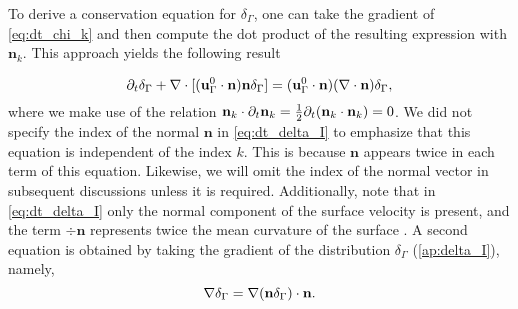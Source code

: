 To derive a conservation equation for $\delta_\Gamma$, one can take the gradient of \ref{eq:dt_chi_k} and then compute the dot product of the resulting expression with $\textbf{n}_k$. This approach yields the following result \citep{marle1982macroscopic,drew1990,lhuillier2000bilan,junqua2003}

\begin{equation}
    \pddt \delta_\Gamma
    + \div [(\textbf{u}_\Gamma^0\cdot \textbf{n}) \textbf{n}\delta_\Gamma ]
    = (\textbf{u}_\Gamma^0 \cdot \textbf{n})(\div\textbf{n}) \delta_\Gamma ,
    \label{eq:dt_delta_I}
\end{equation} 
where we make use of the relation $\textbf{n}_k\cdot \partial_t\textbf{n}_k= \frac{1}{2}\partial_t(\textbf{n}_k\cdot \textbf{n}_k) = 0$. 
We did not specify the index of the normal $\textbf{n}$ in \ref{eq:dt_delta_I} to emphasize that this equation is independent of the index $k$. This is because $\textbf{n}$ appears twice in each term of this equation. 
Likewise, we will omit the index of the normal vector in subsequent discussions unless it is required.
Additionally, note that in \ref{eq:dt_delta_I} only the normal component of the surface velocity is present, and the term $\div \textbf{n}$ represents twice the mean curvature of the surface \citep{aris2012vectors}.  %
A second equation is obtained by taking the gradient of the distribution $\delta_\Gamma $ (\ref{ap:delta_I}), namely, 
\begin{equation}
    \grad\delta_\Gamma  
    =   \grad (\textbf{n} \delta_\Gamma) \cdot \textbf{n}.
    \label{eq:grad_delta_I}
\end{equation}
